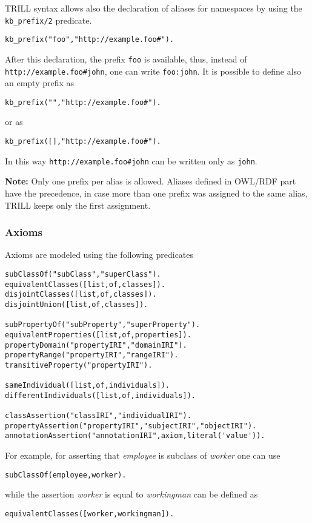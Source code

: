 TRILL syntax allows also the declaration of aliases for namespaces by using the \verb|kb_prefix/2| predicate.
\begin{verbatim}
kb_prefix("foo","http://example.foo#").
\end{verbatim}
After this declaration, the prefix \verb|foo| is available, thus, instead of \verb|http://example.foo#john|, one can write \verb|foo:john|.
It is possible to define also an empty prefix as
\begin{verbatim}
kb_prefix("","http://example.foo#").
\end{verbatim}
or as
\begin{verbatim}
kb_prefix([],"http://example.foo#").
\end{verbatim}
In this way \verb|http://example.foo#john| can be written only as \verb|john|.

\textbf{Note:} Only one prefix per alias is allowed. Aliases defined in OWL/RDF part have the precedence, in case more than one prefix was assigned to the same alias, TRILL keeps only the first assignment.


\subsubsection{Axioms}


Axioms are modeled using the following predicates
\begin{verbatim}
subClassOf("subClass","superClass").
equivalentClasses([list,of,classes]).
disjointClasses([list,of,classes]).
disjointUnion([list,of,classes]).

subPropertyOf("subProperty","superProperty").
equivalentProperties([list,of,properties]).
propertyDomain("propertyIRI","domainIRI").
propertyRange("propertyIRI","rangeIRI").
transitiveProperty("propertyIRI").

sameIndividual([list,of,individuals]).
differentIndividuals([list,of,individuals]).

classAssertion("classIRI","individualIRI").
propertyAssertion("propertyIRI","subjectIRI","objectIRI").
annotationAssertion("annotationIRI",axiom,literal('value')).
\end{verbatim}
For example, for asserting that \textit{employee} is subclass of \textit{worker} one can use
\begin{verbatim}
subClassOf(employee,worker).
\end{verbatim}
while the assertion \textit{worker} is equal to \textit{workingman} can be defined as
\begin{verbatim}
equivalentClasses([worker,workingman]).
\end{verbatim}


